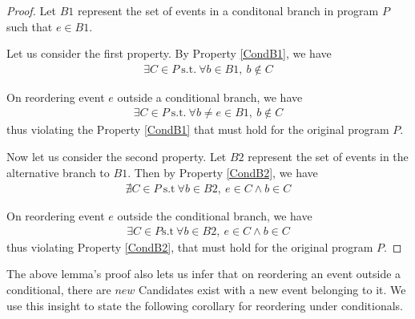         \begin{proof}
            
            Let $B1$ represent the set of events in a conditonal branch in program $P$ such that $e \in B1$. 
            
            Let us consider the first property. 
            By Property \ref{CondB1}, we have 
            \begin{align*}
                \exists C \in P \ \text{s.t.} \ \forall b \in B1, \ b \notin C
            \end{align*}

            On reordering event $e$ outside a conditional branch, we have 
            \begin{align*}
                \exists C \in P \ \text{s.t.} \ \forall b\!\neq\! e \in B1, \ b \notin C
            \end{align*}
            thus violating the Property \ref{CondB1} that must hold for the original program $P$.

            Now let us consider the second property. 
            Let $B2$ represent the set of events in the alternative branch to $B1$. 
            Then by Property \ref{CondB2}, we have 
            \begin{align*}
                \nexists C \in P \ \text{s.t} \ \forall b\!\in\!B2, \ e \in C \wedge b \in C
            \end{align*}

            On reordering event $e$ outside the conditional branch, we have 
            \begin{align*}
                \exists C \in P \text{s.t} \ \forall b\!\in\!B2, \ e \in C \wedge b \in C
            \end{align*}
            thus violating Property \ref{CondB2}, that must hold for the original program $P$.

        \end{proof}

        The above lemma's proof also lets us infer that on reordering an event outside a conditional, there are $new$ Candidates exist with a new event belonging to it. 
        We use this insight to state the following corollary for reordering under conditionals. 

